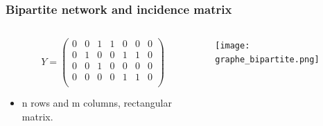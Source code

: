 \documentclass[compress,10pt]{beamer}
\begin{document}
\begin{frame}\frametitle{Bipartite network and incidence matrix}
 \begin{columns}
 \begin{column}{.45\paperwidth}
$$Y=\left(
\begin{array}{rrrrrrr}
0 &   0 &   1 &   1 &   0 &   0 &   0 \\ 
   0 &   1 &   0 &   0 &   1 &   1 &   0 \\ 
   0 &   0 &   1 &   0 &   0 &   0 &   0 \\ 
  0 &   0 &   0 &   0 &   1 &   1 &   0 \\ 
\end{array}\right)
$$


\begin{itemize}
 \item n rows and m columns, rectangular matrix.
 \end{itemize}
\end{column}
\begin{column}{.5\paperwidth}

\texttt{[image: graphe\_bipartite.png]}

\end{column}

\end{columns}
\end{frame}
\end{document}
